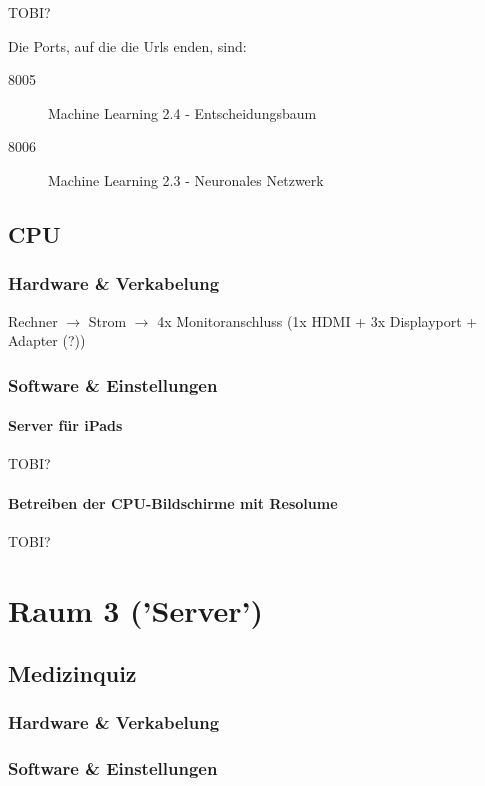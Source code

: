 \documentclass [titlepage,a4paper]{article}
\begin{document}
TOBI?

Die Ports, auf die die Urls enden, sind: \begin{description}
    \item[8005] Machine Learning 2.4 - Entscheidungsbaum
    \item[8006] Machine Learning 2.3 - Neuronales Netzwerk
\end{description}

\subsection{CPU}

\subsubsection{Hardware \& Verkabelung}

Rechner $\rightarrow$ Strom
        $\rightarrow$ 4x Monitoranschluss (1x HDMI + 3x Displayport + Adapter (?))

\subsubsection{Software \& Einstellungen}

\paragraph{Server für iPads}
TOBI?

\paragraph{Betreiben der CPU-Bildschirme mit Resolume}
TOBI?


\newpage
\section{Raum 3 ('Server')}

\subsection{Medizinquiz}

\subsubsection{Hardware \& Verkabelung}

\subsubsection{Software \& Einstellungen}
\end{document}
